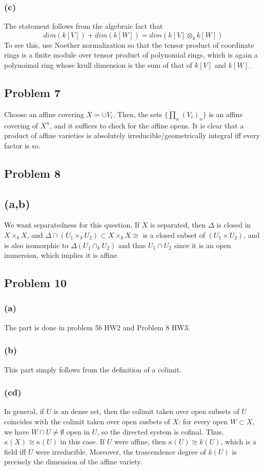 \documentclass{article}
\theoremstyle{definition}
\theoremstyle{definition}
\theoremstyle{definition}
\theoremstyle{definition}
\theoremstyle{definition}
\theoremstyle{definition}
\theoremstyle{definition}
\begin{document}
\subsubsection*{(c)}
The statement follows from the algebraic fact that 
\[dim(k[V])+ dim(k[W])=dim(k[V]\otimes_k k[W])\]
To see this, use Noether normalization so that the tensor product of coordinate rings is a finite module over tensor product of polynomial rings, which is again a polynoimal ring whose krull dimension is the sum of that of $k[V]$ and $k[W]$. 



\subsection*{Problem 7}
Choose an affine covering $X=\cup V_i$. Then, the sets $\{\prod_{n}(V_{i})_n\}$ is an affine covering of $X^n$, and it suffices to check for the affine opens. It is clear that a product of affine varieties is absolutely irreducible/geometrically integral iff every factor is so. 

\subsection*{Problem 8}
\subsection*{(a,b)}
We want separatedness for this question. If $X$ is separated, then $\Delta$ is closed in $X\times_k X$, and $\Delta\cap(U_1\times_k U_2)\subset X\times_k X\cong $ is a closed subset of $(U_1\times U_2)$, and is also isomorphic to $\Delta(U_1\cap_k U_2)$ and thus $U_1\cap U_2$ since it is an open immersion, which implies it is affine.


\subsection*{Problem 10}
\subsubsection*{(a)}
The part is done in problem $5b$ HW2 and Problem $8$ HW3.
\subsubsection*{(b)}
This part simply follows from the definition of a colimit.
\subsubsection*{(cd)}
In general, if $U$ is an dense set, then the colimit taken over open subsets of $U$ coincides with the colimit taken over open susbets of $X$: for every open $W\subset X$, we have $W\cap U\neq \emptyset$ open in $U$, so the directed system is cofinal. Thus, $\kappa(X)\cong \kappa(U)$ in this case. If $U$ were affine, then $\kappa(U)\cong k(U)$, which is a field iff $U$ were irreducible. Moreover, the trascendence degree of $k(U)$ is precisely the dimension of the affine variety.
\end{document}

